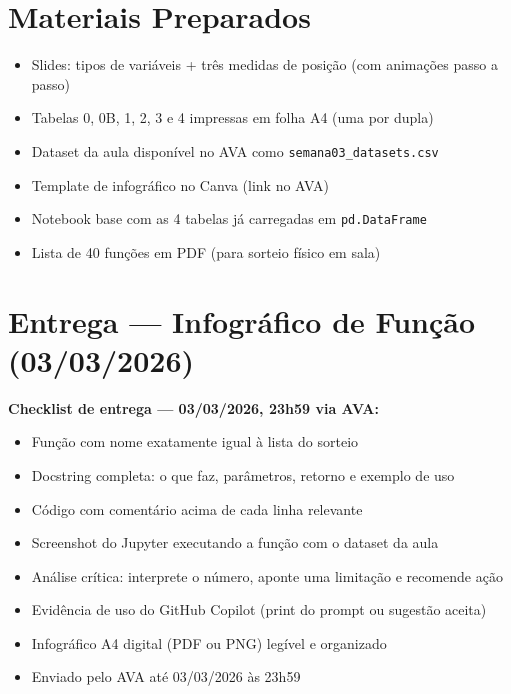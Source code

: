 \section{Materiais Preparados}
\begin{itemize}
  \item Slides: tipos de variáveis + três medidas de posição (com animações passo a passo)
  \item Tabelas 0, 0B, 1, 2, 3 e 4 impressas em folha A4 (uma por dupla)
  \item Dataset da aula disponível no AVA como \texttt{semana03\_datasets.csv}
  \item Template de infográfico no Canva (link no AVA)
  \item Notebook base com as 4 tabelas já carregadas em \texttt{pd.DataFrame}
  \item Lista de 40 funções em PDF (para sorteio físico em sala)
\end{itemize}

\section{Entrega — Infográfico de Função (03/03/2026)}
\begin{SolvedBox}
\textbf{Checklist de entrega — 03/03/2026, 23h59 via AVA:}
\begin{itemize}
  \item[$\square$] Função com nome exatamente igual à lista do sorteio
  \item[$\square$] Docstring completa: o que faz, parâmetros, retorno e exemplo de uso
  \item[$\square$] Código com comentário acima de cada linha relevante
  \item[$\square$] Screenshot do Jupyter executando a função com o dataset da aula
  \item[$\square$] Análise crítica: interprete o número, aponte uma limitação e recomende ação
  \item[$\square$] Evidência de uso do GitHub Copilot (print do prompt ou sugestão aceita)
  \item[$\square$] Infográfico A4 digital (PDF ou PNG) legível e organizado
  \item[$\square$] Enviado pelo AVA até 03/03/2026 às 23h59
\end{itemize}
\end{SolvedBox}

